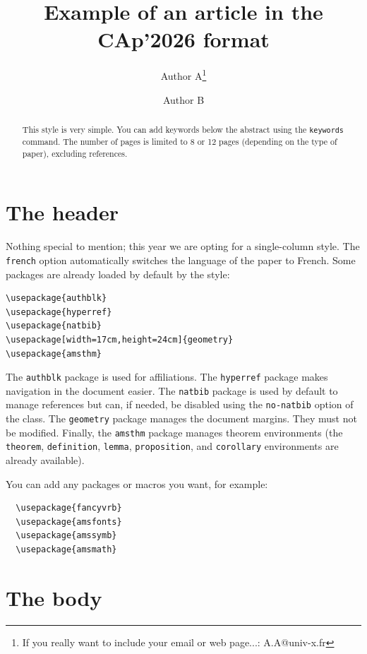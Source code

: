 \documentclass{cap2026}
\title{Example of an article in the CAp'2026 format}
\author[1]{Author A\thanks{If you really want to include your email
    or web page...: A.A@univ-x.fr}}
\author[2]{Author B}
\affil[1]{University X, CNRS}
\affil[2]{University Y, CNRS and Inria}
\begin{document}
\maketitle

\begin{abstract}
  This style is very simple. You can add keywords below the abstract using the \texttt{keywords} command. The number of pages is limited to 8 or 12 pages (depending on the type of paper), excluding references.
  
\medskip

\end{abstract}


\section{The header}
\label{seclentete}

Nothing special to mention; this year we are opting for a single-column style. The \texttt{french} option automatically switches the language of the paper to French. Some packages are already loaded by default by the style:

\begin{Verbatim}
\usepackage{authblk}
\usepackage{hyperref}
\usepackage{natbib}
\usepackage[width=17cm,height=24cm]{geometry}
\usepackage{amsthm}
\end{Verbatim}

The \texttt{authblk} package is used for affiliations. The \texttt{hyperref} package makes navigation in the document easier. The \texttt{natbib} package is used by default to manage references but can, if needed, be disabled using the \texttt{no-natbib} option of the class. The \texttt{geometry} package manages the document margins. They must not be modified. Finally, the \texttt{amsthm} package manages theorem environments (the \texttt{theorem}, \texttt{definition}, \texttt{lemma}, \texttt{proposition}, and \texttt{corollary} environments are already available).

You can add any packages or macros you want, for example:
\begin{Verbatim}
  \usepackage{fancyvrb}
  \usepackage{amsfonts} 
  \usepackage{amssymb}
  \usepackage{amsmath}
\end{Verbatim}

\section{The body}
\label{secle-corps}
\end{document}

